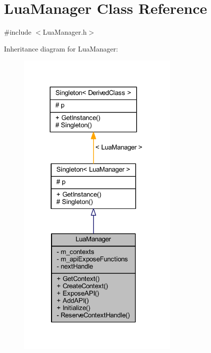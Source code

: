 \hypertarget{class_lua_manager}{}\section{Lua\+Manager Class Reference}
\label{class_lua_manager}


{\ttfamily \#include $<$Lua\+Manager.\+h$>$}



Inheritance diagram for Lua\+Manager\+:\nopagebreak
\begin{figure}[H]
\begin{center}
\leavevmode
\includegraphics[width=221pt]{class_lua_manager__inherit__graph}
\end{center}
\end{figure}


